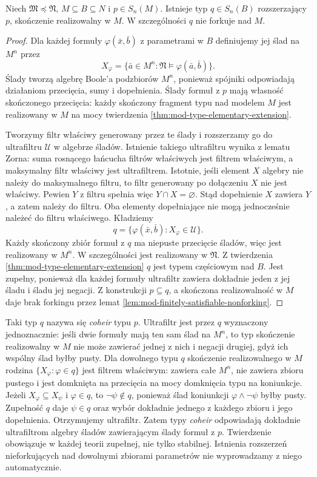 \begin{twierdzenie}
\label{thm:mod-coheir-extension}
Niech $\mathfrak M\preccurlyeq\mathfrak N$,
$M\subseteq B\subseteq N$ i $p\in S_n(M)$.
Istnieje typ $q\in S_n(B)$ rozszerzający $p$,
skończenie realizowalny w $M$.
W szczególności $q$ nie forkuje nad $M$.
\end{twierdzenie}
\begin{proof}
Dla każdej formuły $\varphi(\bar x,\bar b)$
z parametrami w $B$ definiujemy jej ślad
na $M^n$ przez
\[
X_\varphi=\{\bar a\in M^n:
\mathfrak N\models\varphi(\bar a,\bar b)\}.
\]
Ślady tworzą algebrę Boole'a podzbiorów $M^n$,
ponieważ spójniki odpowiadają działaniom
przecięcia, sumy i dopełnienia.
Ślady formuł z $p$ mają własność skończonego
przecięcia: każdy skończony fragment typu
nad modelem $M$ jest realizowany w $M$
na mocy twierdzenia
\ref{thm:mod-type-elementary-extension}.

Tworzymy filtr właściwy generowany przez
te ślady i rozszerzamy go do ultrafiltru
$\mathcal U$ w algebrze śladów.
Istnienie takiego ultrafiltru wynika
z lematu Zorna: suma rosnącego łańcucha
filtrów właściwych jest filtrem właściwym,
a maksymalny filtr właściwy jest ultrafiltrem.
Istotnie, jeśli element $X$ algebry nie należy
do maksymalnego filtru, to filtr generowany
po dołączeniu $X$ nie jest właściwy. Pewien
$Y$ z filtru spełnia więc $Y\cap X=\varnothing$.
Stąd dopełnienie $X$ zawiera $Y$, a zatem należy
do filtru. Oba elementy dopełniające nie mogą
jednocześnie należeć do filtru właściwego.
Kładziemy
\[
q=\{\varphi(\bar x,\bar b):X_\varphi\in\mathcal U\}.
\]
Każdy skończony zbiór formuł z $q$
ma niepuste przecięcie śladów,
więc jest realizowany w $M^n$.
W szczególności jest realizowany w $\mathfrak N$.
Z twierdzenia \ref{thm:mod-type-elementary-extension}
$q$ jest typem częściowym nad $B$.
Jest zupełny, ponieważ dla każdej formuły
ultrafiltr zawiera dokładnie jeden z jej
śladu i śladu jej negacji.
Z konstrukcji $p\subseteq q$, a skończona
realizowalność w $M$ daje brak forkingu
przez lemat \ref{lem:mod-finitely-satisfiable-nonforking}.
\end{proof}

Taki typ $q$ nazywa się \emph{coheir} typu $p$.
Ultrafiltr jest przez $q$ wyznaczony jednoznacznie:
jeśli dwie formuły mają ten sam ślad na $M^n$,
to typ skończenie realizowalny w $M$ nie może
zawierać jednej z nich i negacji drugiej,
gdyż ich wspólny ślad byłby pusty.
Dla dowolnego typu $q$ skończenie realizowalnego
w $M$ rodzina $\{X_\varphi:\varphi\in q\}$ jest
filtrem właściwym: zawiera całe $M^n$, nie zawiera
zbioru pustego i jest domknięta na przecięcia
na mocy domknięcia typu na koniunkcje.
Jeżeli $X_\varphi\subseteq X_\psi$ i $\varphi\in q$,
to $\neg\psi\notin q$, ponieważ ślad koniunkcji
$\varphi\land\neg\psi$ byłby pusty. Zupełność $q$
daje $\psi\in q$ oraz wybór dokładnie jednego
z każdego zbioru i jego dopełnienia. Otrzymujemy
ultrafiltr. Zatem typy
\emph{coheir} odpowiadają dokładnie ultrafiltrom
algebry śladów zawierającym ślady formuł z $p$.
Twierdzenie obowiązuje w każdej teorii zupełnej,
nie tylko stabilnej. Istnienia rozszerzeń
nieforkujących nad dowolnymi zbiorami
parametrów nie wyprowadzamy z niego automatycznie.

